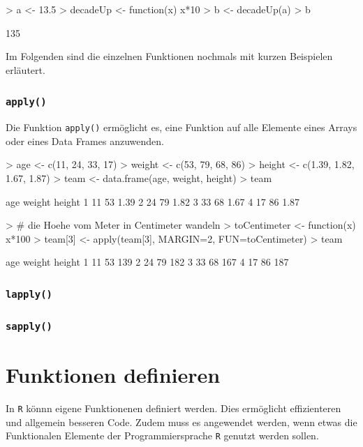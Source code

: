 \begin{Schunk}
\begin{Sinput}
> a <- 13.5
> decadeUp <- function(x) {x*10}
> b <- decadeUp(a)
> b
\end{Sinput}
\begin{Soutput}
[1] 135
\end{Soutput}
\end{Schunk}

Im Folgenden sind die einzelnen Funktionen nochmals mit kurzen 
Beispielen erläutert.

\subsubsection{\lstinline{apply()}}
Die Funktion \lstinline{apply()} ermöglicht es, eine Funktion auf
alle Elemente eines Arrays oder eines Data Frames anzuwenden.

\begin{Schunk}
\begin{Sinput}
> age <- c(11, 24, 33, 17)
> weight <- c(53, 79, 68, 86)
> height <- c(1.39, 1.82, 1.67, 1.87)
> team <- data.frame(age, weight, height)
> team
\end{Sinput}
\begin{Soutput}
  age weight height
1  11     53   1.39
2  24     79   1.82
3  33     68   1.67
4  17     86   1.87
\end{Soutput}
\begin{Sinput}
> # die Hoehe vom Meter in Centimeter wandeln
> toCentimeter <- function(x) {x*100}
> team[3] <- apply(team[3], MARGIN=2, FUN=toCentimeter)
> team
\end{Sinput}
\begin{Soutput}
  age weight height
1  11     53    139
2  24     79    182
3  33     68    167
4  17     86    187
\end{Soutput}
\end{Schunk}

\subsubsection{\lstinline{lapply()}}
\subsubsection{\lstinline{sapply()}}

\section{Funktionen definieren}
In \lstinline{R} könnn eigene Funktionenen definiert werden.
Dies ermöglicht effizienteren und allgemein besseren Code.
Zudem muss es angewendet werden, wenn etwas die Funktionalen
Elemente der Programmiersprache \lstinline{R} genutzt werden
sollen.

